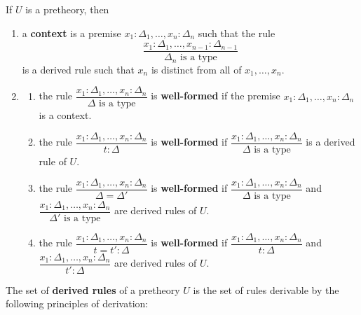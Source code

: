 \begin{definition}
    If $U$ is a pretheory, then
    \begin{enumerate}
        \item a \textbf{context} is a premise $x_1 : \Delta_1, \dots, x_n : \Delta_n$
            such that the rule
            \begin{equation*}
                \dfrac{
                    x_1 : \Delta_1, \dots, x_{n-1}: \Delta_{n-1}
                }{
                    \Delta_n \text{ is a type}
                }
            \end{equation*}
            is a derived rule such that $x_n$ is distinct from all of $x_1, \dots, x_n$.
        \item \begin{enumerate}
            \item the rule $\dfrac{x_1 : \Delta_1, \dots, x_n : \Delta_n}{\Delta \text{ is a type}}$
                  is \textbf{well-formed} if the premise $x_1 : \Delta_1, \dots, x_n : \Delta_n$ is a context.
            \item the rule $\dfrac{x_1 : \Delta_1, \dots, x_n : \Delta_n}{t : \Delta}$
                  is \textbf{well-formed} if $\dfrac{x_1 : \Delta_1, \dots, x_n : \Delta_n}{\Delta \text{ is a type}}$
                  is a derived rule of $U$.
            \item the rule $\dfrac{x_1 : \Delta_1, \dots, x_n : \Delta_n}{\Delta = \Delta'}$
                  is \textbf{well-formed} if $\dfrac{x_1 : \Delta_1, \dots, x_n : \Delta_n}{\Delta \text{ is a type}}$
                  and \\ $\dfrac{x_1 : \Delta_1, \dots, x_n : \Delta_n}{\Delta' \text{ is a type}}$
                  are derived rules of $U$.
            \item the rule $\dfrac{x_1 : \Delta_1, \dots, x_n : \Delta_n}{t = t' : \Delta}$
                  is \textbf{well-formed} if $\dfrac{x_1 : \Delta_1, \dots, x_n : \Delta_n}{t : \Delta}$
                  and \\ $\dfrac{x_1 : \Delta_1, \dots, x_n : \Delta_n}{t' : \Delta}$
                  are derived rules of $U$.
        \end{enumerate}
    \end{enumerate}
\end{definition}

\begin{definition}
    The set of \textbf{derived rules} of a pretheory $U$ is the
    set of rules derivable by the following principles of derivation:
    
\end{definition}

